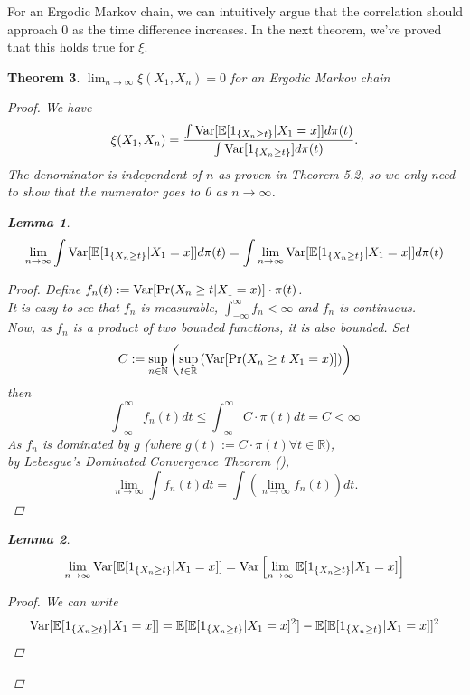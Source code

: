 \documentclass{article}
\newtheorem{theorem}{Theorem}[section]
\newtheorem{lemma}[theorem]{Lemma}
\begin{document}
	For an Ergodic Markov chain, we can intuitively argue that the correlation should approach $0$ as the time difference increases.
	In the next theorem, we've proved that this holds true for $\xi$.
	\begin{theorem}
		$\lim_{n \rightarrow \infty} \xi(X_1, X_{n}) = 0$ for an Ergodic Markov chain
		\begin{proof}
			We have
			\begin{equation*}
				\xi(X_1, X_{n}) = \frac{\int \text{Var}[\mathbb{E}[1_{\{X_{n} \geq t\}}|X_1=x]] d\pi(t)}{\int \text{Var}[1_{\{X_{n} \geq t\}}] d\pi(t)}.
			\end{equation*}
			The denominator is independent of $n$ as proven in Theorem 5.2, so we only need to show that the numerator goes to 0 as $n \rightarrow \infty$.\\
			\begin{lemma}
				$$\lim_{n \rightarrow \infty} \int \text{Var}[\mathbb{E}[1_{\{X_{n} \geq t\}}|X_1=x]] d\pi(t) = \int \lim_{n \rightarrow \infty}\text{Var}[\mathbb{E}[1_{\{X_{n} \geq t\}}|X_1=x]] d\pi(t)$$
				\begin{proof}
					Define $f_n(t) := \text{Var}[\Pr(X_{n} \geq t | X_{1} = x)] \cdot \pi(t)$. \\
					It is easy to see that $f_n$ is measurable, $\int_{-\infty}^{\infty} f_n < \infty$ and $f_n$ is continuous.\\
					Now, as $f_n$ is a product of two bounded functions, it is also bounded.
					Set
					$$ C:= \sup_{n \in \mathbb{N}} \left(\sup_{t \in \mathbb{R}} \left(\text{Var}[\Pr(X_{n} \geq t | X_{1} = x)]\right)\right)$$
					then
					$$\int_{-\infty}^{\infty} f_n(t)dt \leq \int_{-\infty}^{\infty} C\cdot\pi(t)dt = C < \infty$$
					As $f_n$ is dominated by $g$ (where $g(t) := C\cdot\pi(t) \forall t \in \mathbb{R})$, \\
					by Lebesgue's Dominated Convergence Theorem (\cite{kl2001chung}),
					$$\lim_{n \rightarrow \infty} \int f_n(t) dt = \int \left(\lim_{n \rightarrow \infty} f_n(t)\right) dt.$$
				\end{proof}
			\end{lemma}
			\begin{lemma}
				$$\lim_{n \rightarrow \infty} \text{Var}[\mathbb{E}[1_{\{X_{n} \geq t\}}|X_1=x]] = \text{Var}\left[\lim_{n \rightarrow \infty} \mathbb{E}[1_{\{X_{n} \geq t\}}|X_1=x]\right]$$
				\begin{proof}
					We can write
					\begin{align*}
						\Var[\mathbb{E}[1_{\{X_{n} \geq t\}}|X_1=x]] &= \mathbb{E}[\mathbb{E}[1_{\{X_{n} \geq t\}}|X_1=x]^2] - \mathbb{E}[\mathbb{E}[1_{\{X_{n} \geq t\}}|X_1=x]]^2 \\

\end{align*}
\end{proof}
\end{lemma}
\end{proof}
\end{theorem}
\end{document}
